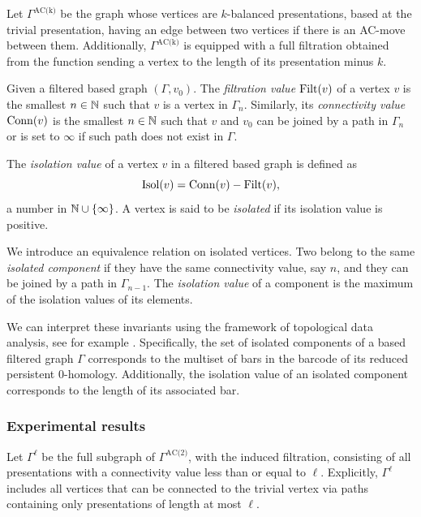 Let $\Gamma^{\text{AC(k)}}$ be the graph whose vertices are $k$-balanced presentations, based at the trivial presentation, having an edge between two vertices if there is an AC-move between them.
Additionally, $\Gamma^{\text{AC(k)}}$ is equipped with a full filtration obtained from the function sending a vertex to the length of its presentation minus $k$.


Given a filtered based graph $(\Gamma, v_0)$.
The \textit{filtration value} $\operatorname{Filt}(v)$ of a vertex $v$ is the smallest $n \in \mathbb{N}$ such that $v$ is a vertex in $\Gamma_n$.
Similarly, its \textit{connectivity value} $\operatorname{Conn}(v)$ is the smallest $n \in \mathbb{N}$ such that $v$ and $v_0$ can be joined by a path in $\Gamma_n$ or is set to $\infty$ if such path does not exist in $\Gamma$.

The \textit{isolation value} of a vertex $v$ in a filtered based graph is defined as
\[
\operatorname{Isol}(v) = \operatorname{Conn}(v) - \operatorname{Filt}(v),
\]
a number in $\mathbb{N} \cup \{\infty\}$.
A vertex is said to be \textit{isolated} if its isolation value is positive.

We introduce an equivalence relation on isolated vertices.
Two belong to the same \textit{isolated component} if they have the same connectivity value, say $n$, and they can be joined by a path in $\Gamma_{n-1}$.
The \textit{isolation value} of a component is the maximum of the isolation values of its elements.

We can interpret these invariants using the framework of topological data analysis, see for example \cite{carlsson2022tda}.
Specifically, the set of isolated components of a based filtered graph $\Gamma$ corresponds to the multiset of bars in the barcode of its reduced persistent $0$-homology.
Additionally, the isolation value of an isolated component corresponds to the length of its associated bar.

\subsubsection{Experimental results}

Let \(\Gamma^\ell\) be the full subgraph of \(\Gamma^{\text{AC(2)}}\), with the induced filtration, consisting of all presentations with a connectivity value less than or equal to \(\ell\).
Explicitly, \(\Gamma^\ell\) includes all vertices that can be connected to the trivial vertex via paths containing only presentations of length at most \(\ell\).

